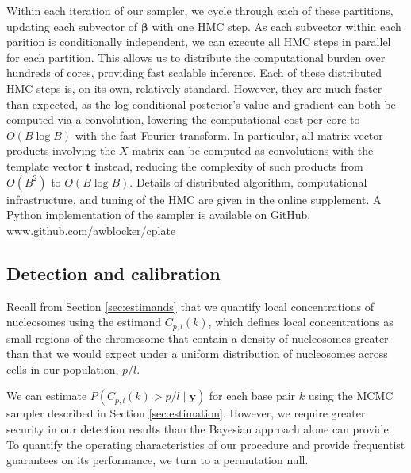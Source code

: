 Within each iteration of our sampler, we cycle through each of these partitions, updating each subvector of $\bm \beta$ with one HMC step.
As each subvector within each parition is conditionally independent, we can execute all HMC steps in parallel for each partition.
This allows us to distribute the computational burden over hundreds of cores, providing fast scalable inference.
Each of these distributed HMC steps is, on its own, relatively standard.
However, they are much faster than expected, as the log-conditional posterior's value and gradient can both be computed via a convolution, lowering the computational cost per core to $O(B \log B)$ with the fast Fourier transform. 
In particular, all matrix-vector products involving the $X$ matrix can be computed as convolutions with the template vector $\bm t$ instead, reducing the complexity of such products from $O(B^2)$ to $O(B \log B)$.
Details of distributed algorithm, computational infrastructure, and tuning of the HMC are given in the online supplement. %
A Python implementation of the sampler is available on GitHub, \url{www.github.com/awblocker/cplate}	

\subsection{Detection and calibration}
\label{sec:detection}

Recall from Section \ref{sec:estimands} that we quantify  local concentrations of nucleosomes using the estimand $C_{p,l}(k)$, which defines local concentrations as small regions of the chromosome that contain a density of nucleosomes greater than that we would expect under a uniform distribution of nucleosomes across cells in our population, $p / l$.

We can estimate $P(C_{p,l}(k) > p / l \mid \bm y)$ for each base pair $k$ using the MCMC sampler described in Section \ref{sec:estimation}.
However, we require greater security in our detection results than the Bayesian approach alone can provide.
To quantify the operating characteristics of our procedure and provide frequentist guarantees on its performance, we turn to a permutation null.

